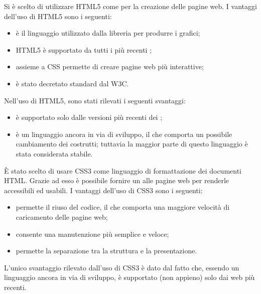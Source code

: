 Si è scelto di utilizzare HTML5 come  per la creazione delle pagine web.
I vantaggi dell'uso di HTML5 sono i seguenti:
\begin{itemize}
\item è il linguaggio utilizzato dalla libreria  per produrre i grafici;
\item HTML5 è supportato da tutti i più recenti ;
\item assieme a CSS permette di creare pagine web più interattive;
\item è stato decretato standard dal W3C.
\end{itemize}
Nell'uso di HTML5, sono stati rilevati i seguenti svantaggi:
\begin{itemize}
\item è supportato solo dalle versioni più recenti dei ;
\item è un linguaggio ancora in via di sviluppo, il che comporta un possibile cambiamento dei costrutti; tuttavia la maggior parte di questo linguaggio è stata considerata stabile.
\end{itemize}

È stato scelto di usare CSS3 come linguaggio di formattazione dei documenti HTML. Grazie ad esso è possibile fornire un  alle pagine web per renderle accessibili ed usabili.
I vantaggi dell'uso di CSS3 sono i seguenti:
\begin{itemize}
\item permette il riuso del codice, il che comporta una maggiore velocità di caricamento delle pagine web;
\item consente una manutenzione più semplice e veloce;
\item permette la separazione tra la struttura e la presentazione.
\end{itemize}
L'unico svantaggio rilevato dall'uso di CSS3 è dato dal fatto che, essendo un linguaggio ancora in via di sviluppo, è supportato (non appieno) solo dai web  più recenti.

